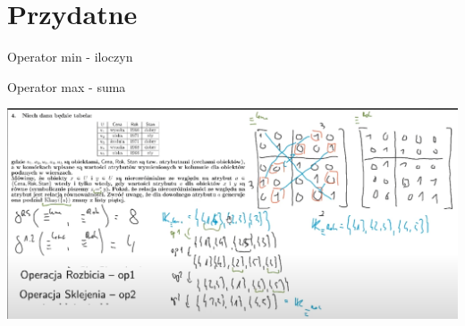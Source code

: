 \documentclass[12pt]{article}
\begin{document}
\section{Przydatne}

Operator min - iloczyn

Operator max - suma

\begin{center}
    \includegraphics[scale=0.53]{atrybuty.png}
\end{center}
\end{document}

